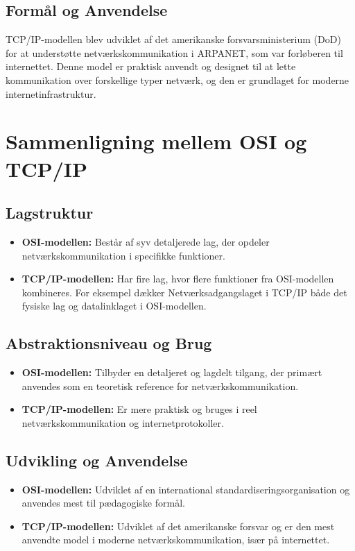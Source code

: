 \subsection{Formål og Anvendelse}
TCP/IP-modellen blev udviklet af det amerikanske forsvarsministerium (DoD) for at understøtte netværkskommunikation i ARPANET, som var forløberen til internettet. Denne model er praktisk anvendt og designet til at lette kommunikation over forskellige typer netværk, og den er grundlaget for moderne internetinfrastruktur.

\section{Sammenligning mellem OSI og TCP/IP}
\subsection{Lagstruktur}
\begin{itemize}
	\item \textbf{OSI-modellen:} Består af syv detaljerede lag, der opdeler netværkskommunikation i specifikke funktioner.
	\item \textbf{TCP/IP-modellen:} Har fire lag, hvor flere funktioner fra OSI-modellen kombineres. For eksempel dækker Netværksadgangslaget i TCP/IP både det fysiske lag og datalinklaget i OSI-modellen.
\end{itemize}

\subsection{Abstraktionsniveau og Brug}
\begin{itemize}
	\item \textbf{OSI-modellen:} Tilbyder en detaljeret og lagdelt tilgang, der primært anvendes som en teoretisk reference for netværkskommunikation.
	\item \textbf{TCP/IP-modellen:} Er mere praktisk og bruges i reel netværkskommunikation og internetprotokoller.
\end{itemize}

\subsection{Udvikling og Anvendelse}
\begin{itemize}
	\item \textbf{OSI-modellen:} Udviklet af en international standardiseringsorganisation og anvendes mest til pædagogiske formål.
	\item \textbf{TCP/IP-modellen:} Udviklet af det amerikanske forsvar og er den mest anvendte model i moderne netværkskommunikation, især på internettet.
\end{itemize}

